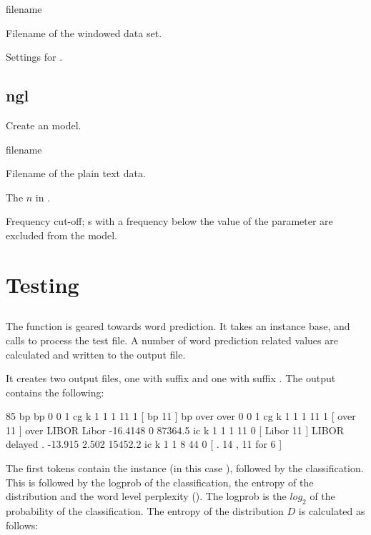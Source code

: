 \documentclass[a4paper,10pt,twoside]{report}
\begin{document}
\begin{varlist}{filename}
\item[filename] Filename of the windowed data set.
\item[timbl] Settings for \Timbl{}.
\end{varlist}

\subsection{ngl}

Create an \ngram{} model.

\begin{varlist}{filename}
\item[filename] Filename of the plain text data.
\item[n] The $n$ in \ngram{}.
\item[fco] Frequency cut-off; \ngram{}s with a frequency below the
  value of the  parameter are excluded from the model.
\end{varlist}


\section{Testing}

\subsection{}

The  function is geared towards word prediction. It takes
an instance base, and calls \Timbl{} to process the test file. A
number of word prediction related values are calculated and written to
the output file.

It creates two output files, one with suffix  and one with
suffix .  The  output contains the following:

\begin{wout}{}
85 bp bp 0 0 1 cg k 1 1 1 11 1 [ bp 11 ]
bp over over 0 0 1 cg k 1 1 1 11 1 [ over 11 ]
over LIBOR Libor -16.4148 0 87364.5 ic k 1 1 1 11 0 [ Libor 11 ]
LIBOR delayed . -13.915 2.502 15452.2 ic k 1 1 8 44 0 [ . 14 , 11 for 6 ]
\end{wout}

The first tokens contain the instance (in this case ),
followed by the classification. This is followed by the logprob of the
classification, the entropy of the distribution and the word level
perplexity (\wlp{}). The logprob is the $log_2$ of the probability of the
classification. The entropy of the distribution $D$ is calculated as
follows:
\end{document}
